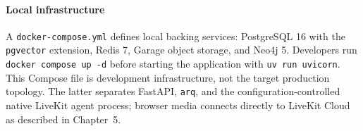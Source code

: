 \paragraph{Local infrastructure}
A \texttt{docker-compose.yml} defines local backing services: PostgreSQL 16 with the \texttt{pgvector} extension, Redis 7, Garage object storage, and Neo4j 5. Developers run \texttt{docker compose up -d} before starting the application with \texttt{uv run uvicorn}. This Compose file is development infrastructure, not the target production topology. The latter separates FastAPI, \texttt{arq}, and the configuration-controlled native LiveKit agent process; browser media connects directly to LiveKit Cloud as described in Chapter~5.
